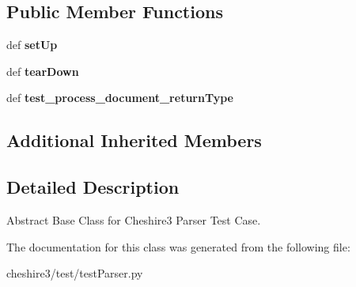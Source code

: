 \subsection*{Public Member Functions}
\begin{DoxyCompactItemize}
\item 
\hypertarget{classcheshire3_1_1test_1_1test_parser_1_1_parser_test_case_a2d8736e73d6555aac1ce7e8b78e6c187}{def {\bfseries set\-Up}}\label{classcheshire3_1_1test_1_1test_parser_1_1_parser_test_case_a2d8736e73d6555aac1ce7e8b78e6c187}

\item 
\hypertarget{classcheshire3_1_1test_1_1test_parser_1_1_parser_test_case_a45bc1072a0e318b352aac89395a3aaa7}{def {\bfseries tear\-Down}}\label{classcheshire3_1_1test_1_1test_parser_1_1_parser_test_case_a45bc1072a0e318b352aac89395a3aaa7}

\item 
\hypertarget{classcheshire3_1_1test_1_1test_parser_1_1_parser_test_case_ac804b5beb5be1eb17abcefb1fc2fcb90}{def {\bfseries test\-\_\-process\-\_\-document\-\_\-return\-Type}}\label{classcheshire3_1_1test_1_1test_parser_1_1_parser_test_case_ac804b5beb5be1eb17abcefb1fc2fcb90}

\end{DoxyCompactItemize}
\subsection*{Additional Inherited Members}


\subsection{Detailed Description}
\begin{DoxyVerb}Abstract Base Class for Cheshire3 Parser Test Case.\end{DoxyVerb}
 

The documentation for this class was generated from the following file\-:\begin{DoxyCompactItemize}
\item 
cheshire3/test/test\-Parser.\-py\end{DoxyCompactItemize}
